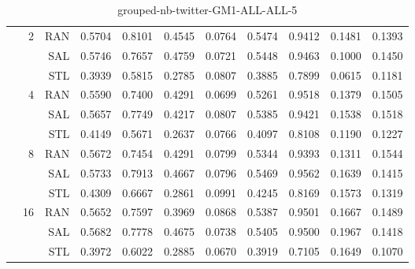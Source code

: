 \begin{center}
\begin{table}[htbp]
\begin{center}
\begin{tabular}{ | r | r | r | r | r | r | r | r | r | r | r |}
 & \multirow{3}{*}{2} & RAN & 0.5704 & 0.8101 & 0.4545 & 0.0764 & 0.5474 & 0.9412 & 0.1481 & 0.1393\\ \cline{3-11}
 &   & SAL & 0.5746 & 0.7657 & 0.4759 & 0.0721 & 0.5448 & 0.9463 & 0.1000 & 0.1450\\ \cline{3-11}
 &   & STL & 0.3939 & 0.5815 & 0.2785 & 0.0807 & 0.3885 & 0.7899 & 0.0615 & 0.1181\\ \cline{2-11}
 & \multirow{3}{*}{4} & RAN & 0.5590 & 0.7400 & 0.4291 & 0.0699 & 0.5261 & 0.9518 & 0.1379 & 0.1505\\ \cline{3-11}
 &   & SAL & 0.5657 & 0.7749 & 0.4217 & 0.0807 & 0.5385 & 0.9421 & 0.1538 & 0.1518\\ \cline{3-11}
 &   & STL & 0.4149 & 0.5671 & 0.2637 & 0.0766 & 0.4097 & 0.8108 & 0.1190 & 0.1227\\ \cline{2-11}
 & \multirow{3}{*}{8} & RAN & 0.5672 & 0.7454 & 0.4291 & 0.0799 & 0.5344 & 0.9393 & 0.1311 & 0.1544\\ \cline{3-11}
 &   & SAL & 0.5733 & 0.7913 & 0.4667 & 0.0796 & 0.5469 & 0.9562 & 0.1639 & 0.1415\\ \cline{3-11}
 &   & STL & 0.4309 & 0.6667 & 0.2861 & 0.0991 & 0.4245 & 0.8169 & 0.1573 & 0.1319\\ \cline{2-11}
 & \multirow{3}{*}{16} & RAN & 0.5652 & 0.7597 & 0.3969 & 0.0868 & 0.5387 & 0.9501 & 0.1667 & 0.1489\\ \cline{3-11}
 &   & SAL & 0.5682 & 0.7778 & 0.4675 & 0.0738 & 0.5405 & 0.9500 & 0.1967 & 0.1418\\ \cline{3-11}
 &   & STL & 0.3972 & 0.6022 & 0.2885 & 0.0670 & 0.3919 & 0.7105 & 0.1649 & 0.1070\\ \cline{2-11}
\hline
\end{tabular}
\caption{grouped-nb-twitter-GM1-ALL-ALL-5}
\end{center}
 \end{table}
\end{center}

